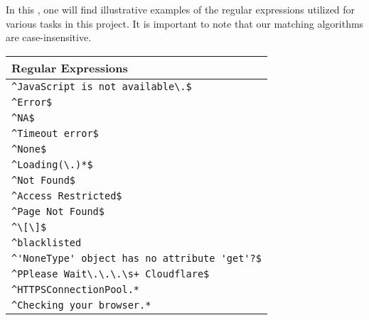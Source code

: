 \label{appendix02:regular_expressions}

In this \appendixname{}, one will find illustrative examples of the regular expressions utilized for various tasks in this project. It is important to note that our matching algorithms are case-insensitive.

\label{appendix02:pesv_error_regex}

\begin{table}[ht]
\centering
\begin{tabular}{|l|}
\hline
\textbf{Regular Expressions} \\ \hline
\verb|^JavaScript is not available\.$| \\
\verb|^Error$| \\
\verb|^NA$| \\
\verb|^Timeout error$| \\
\verb|^None$| \\
\verb|^Loading(\.)*$| \\
\verb|^Not Found$| \\
\verb|^Access Restricted$| \\
\verb|^Page Not Found$| \\
\verb|^\[\]$| \\
\verb|^blacklisted| \\
\verb|^'NoneType' object has no attribute 'get'?$| \\
\verb|^PPlease Wait\.\.\.\s+ Cloudflare$| \\
\verb|^HTTPSConnectionPool.*| \\
\verb|^Checking your browser.*| \\

\end{tabular}
\end{table}
